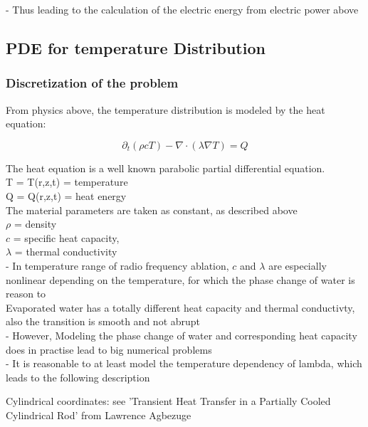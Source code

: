 \documentclass[parskip=half, titlepage=yes, 12pt, BCOR=12mm, DIV=calc]{scrartcl}
\begin{document}
- Thus leading to the calculation of the electric energy from electric power above \\


\subsection{PDE for temperature Distribution}

\subsubsection{Discretization of the problem}

From physics above, the temperature distribution is modeled by the heat equation: 

\begin{equation}
    \partial_t (\rho c T) - \nabla \cdot (\lambda \nabla T) = Q
\end{equation}

The heat equation is a well known parabolic partial differential equation. \\

T = T(r,z,t) = temperature \\
Q = Q(r,z,t) = heat energy \\

The material parameters are taken as constant, as described above \\
$\rho$ = density \\
$c$ = specific heat capacity, \\
$\lambda$ = thermal conductivity \\
- In temperature range of radio frequency ablation, $c$ and $\lambda$ are especially nonlinear depending on the temperature, for which the phase change of water is reason to \\ Evaporated water has a totally different heat capacity and thermal conductivty, also the transition is smooth and not abrupt \\


- However, Modeling the phase change of water and corresponding heat capacity does in practise lead to big numerical problems \\

- It is reasonable to at least model the temperature dependency of lambda, which leads to the following description

Cylindrical coordinates: see 'Transient Heat Transfer in a Partially Cooled Cylindrical Rod' from Lawrence Agbezuge
\end{document}
